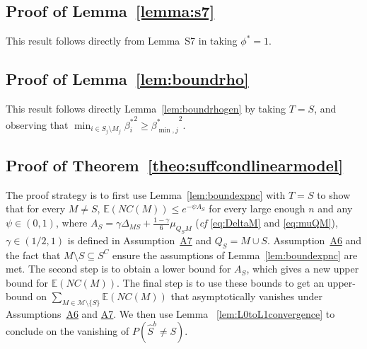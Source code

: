 \documentclass[bj,authoryear]{imsart}
\theoremstyle{plain}
\newcommand{\E}{\mathbb{E}}
\newcommand{\M}{\mathcal{M}}
\begin{document}
\subsection{Proof of Lemma~\ref{lemma:s7}}
    This result follows directly from Lemma~S7 in \cite{rossell2022concentration} taking $\phi^*=1$.

\subsection{Proof of Lemma~\ref{lem:boundrho}}
This result follows directly Lemma~\ref{lem:boundrhogen} by taking $T=S$, and observing that $\min_{i\in S_j\setminus M_j}{\beta^*_i}^2\geq {\beta^*_{\min,j}}^2$.

\subsection{Proof of Theorem~\ref{theo:suffcondlinearmodel}} 
The proof strategy is to first use Lemma~\ref{lem:boundexpnc} with $T=S$ to show that for every $M\neq S$, $\E(NC(M)) \leq e^{-\psi A_S}$ for every large enough $n$ and any $\psi \in (0,1)$, where $A_S=\gamma\Delta_{MS}+\tfrac{1-\gamma}{6}\mu_{Q_SM}$ (\emph{cf} \eqref{eq:DeltaM} and \eqref{eq:muQM}), $\gamma\in(1/2,1)$ is defined in Assumption~\hyperlink{lab:A7}{A7} and $Q_S= M\cup S$. Assumption~\hyperlink{lab:A6}{A6} and the fact that $M\setminus S\subseteq S^C$ ensure the 
assumptions of Lemma~\ref{lem:boundexpnc} are met. 
The second step is to obtain a lower bound for $A_S$, which gives a new upper bound for $\E(NC(M))$.
The final step is to use these bounds to get an upper-bound on $\sum_{M \in \M\setminus \{S\}} \E\left(NC(M)\right)$ that asymptotically vanishes under Assumptions~\hyperlink{lab:A6}{A6} and \hyperlink{lab:A7}{A7}. We then use Lemma~ \ref{lem:L0toL1convergence} to conclude on the vanishing of $P(\hat S^b \neq S)$. 
\end{document}
